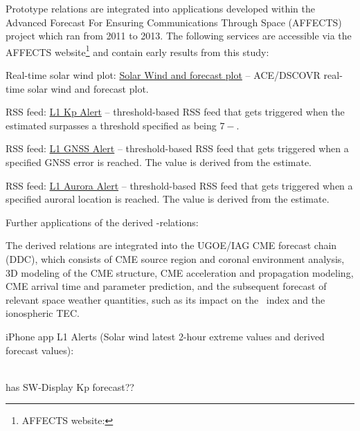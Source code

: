 Prototype \Kp{} relations are integrated into applications developed within the Advanced Forecast For Ensuring Communications Through Space (\mbox{AFFECTS}) project which ran from 2011 to 2013. The following services are accessible via the \mbox{AFFECTS} website\footnote{AFFECTS website: } and contain early results from this \Kp{} study:
\begin{itemize*}
	\item Real-time solar wind plot: \href{http://www.affects-fp7.eu/rssfeeds/ace_ap_forecast_plot/ace_realtime_ap_CH_GFT_plot.png}{Solar Wind and \Kp{} forecast plot} -- ACE/DSCOVR real-time solar wind and \Kp{} forecast plot.
	\item RSS feed: \href{http://www.affects-fp7.eu/rssfeeds/rssfeed_kp/rssfeed_kp.xml}{L1 Kp Alert} -- threshold-based RSS feed that gets triggered when the estimated \Kp{} surpasses a threshold specified as being $7-$.
	\item RSS feed: \href{http://www.affects-fp7.eu/rssfeeds/rssfeed_gnss/rssfeed_gnss.xml}{L1 GNSS Alert} -- threshold-based RSS feed that gets triggered when a specified GNSS error is reached. The value is derived from the \Kp{} estimate.
	\item RSS feed: \href{http://www.affects-fp7.eu/rssfeeds/rssfeed_aurora/rssfeed_aurora.xml}{L1 Aurora Alert} -- threshold-based RSS feed that gets triggered when a specified auroral location is reached. The value is derived from the \Kp{} estimate.
\end{itemize*}

\noindent Further applications of the derived \Kp{}-relations:
\begin{itemize*}
	\item The derived \Kp{} relations are integrated into the UGOE/IAG CME forecast chain (DDC), which consists of CME source region and coronal environment analysis, 3D modeling of the CME structure, CME acceleration and propagation modeling, CME arrival time and parameter prediction, and the subsequent forecast of relevant space weather quantities, such as its impact on the \Kp~index and the ionospheric TEC.
	\item iPhone app L1 Alerts (Solar wind latest 2-hour extreme values and derived forecast values):\\
	\\
	\item has SW-Display Kp forecast??
\end{itemize*}



